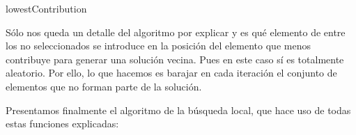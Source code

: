 \documentclass[11pt,a4paper]{article}
\begin{document}
	\begin{algorithm}[H]
	\caption{\sc lowestContribution}
	\end{algorithm}
\vspace{8mm}
 	Sólo nos queda un detalle del algoritmo por explicar y es qué elemento de entre los no seleccionados se introduce en la posición del elemento que menos contribuye para generar una solución vecina. Pues en este caso sí es totalmente aleatorio. Por ello, lo que hacemos es barajar en cada iteración el conjunto de elementos que no forman parte de la solución. 

	Presentamos finalmente el algoritmo de la búsqueda local, que hace uso de todas estas funciones explicadas:
	
\end{document}
